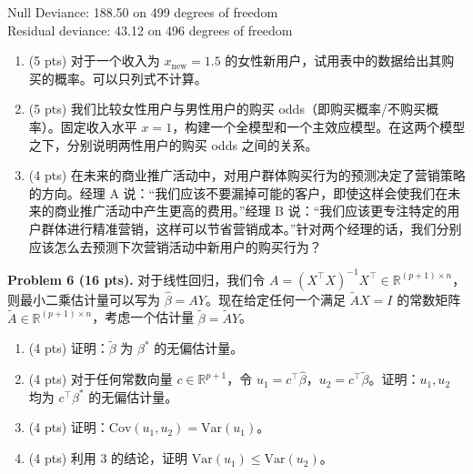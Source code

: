 \documentclass[11pt]{ctexart}
\begin{document}
\noindent Null Deviance: 188.50 on 499 degrees of freedom\\
Residual deviance: 43.12 on 496 degrees of freedom

\begin{enumerate}
\item (5 pts) 对于一个收入为 $x_{\mathrm{new}} = 1.5$ 的女性新用户，试用表中的数据给出其购买的概率。可以只列式不计算。
\item (5 pts) 我们比较女性用户与男性用户的购买 odds（即购买概率/不购买概率）。固定收入水平 $x = 1$，构建一个全模型和一个主效应模型。在这两个模型之下，分别说明两性用户的购买 odds 之间的关系。
\item (4 pts) 在未来的商业推广活动中，对用户群体购买行为的预测决定了营销策略的方向。经理 A 说：“我们应该不要漏掉可能的客户，即使这样会使我们在未来的商业推广活动中产生更高的费用。”经理 B 说：“我们应该更专注特定的用户群体进行精准营销，这样可以节省营销成本。”针对两个经理的话，我们分别应该怎么去预测下次营销活动中新用户的购买行为？
\end{enumerate}

\noindent\textbf{Problem 6 (16 pts).} 对于线性回归，我们令 $A = (X^{\top}X)^{-1}X^{\top} \in \mathbb{R}^{(p+1)\times n}$，则最小二乘估计量可以写为 $\hat{\beta} = AY$。现在给定任何一个满足 $\tilde{A}X = I$ 的常数矩阵 $\tilde{A} \in \mathbb{R}^{(p+1)\times n}$，考虑一个估计量 $\tilde{\beta} = \tilde{A}Y$。
\begin{enumerate}
\item (4 pts) 证明：$\tilde{\beta}$ 为 $\beta^*$ 的无偏估计量。
\item (4 pts) 对于任何常数向量 $c \in \mathbb{R}^{p+1}$，令 $u_1 = c^{\top}\hat{\beta}$，$u_2 = c^{\top}\tilde{\beta}$。证明：$u_1, u_2$ 均为 $c^{\top}\beta^*$ 的无偏估计量。
\item (4 pts) 证明：$\mathrm{Cov}(u_1, u_2) = \mathrm{Var}(u_1)$。
\item (4 pts) 利用 3 的结论，证明 $\mathrm{Var}(u_1) \leq \mathrm{Var}(u_2)$。
\end{enumerate}
\end{document}
